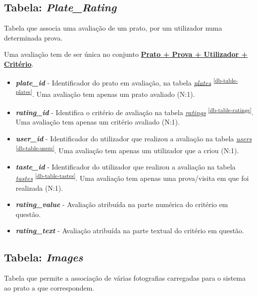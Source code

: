 \documentclass[11pt, a4paper, sans]{article}
\begin{document}
	\subsection{Tabela: \textit{Plate\_Rating}} \label{db-table-plate-rating}
	
	Tabela que associa uma avaliação de um prato, por um utilizador numa determinada prova. 
	
	Uma avaliação tem de ser única no conjunto \underline{\textbf{Prato + Prova + Utilizador + Critério}}.
	
	\begin{itemize}
		\item \textbf{\textit{plate\_id}} - Identificador do prato em avaliação, na tabela 
			\underline{\textit{plates}} \textsuperscript{\ref{db-table-plates}}. 
			Uma avaliação tem apenas um prato avaliado (N:1).
		\item \textbf{\textit{rating\_id}} - Identifica o critério de avaliação na tabela 
			\underline{\textit{ratings}} \textsuperscript{\ref{db-table-ratings}}.
			Uma avaliação tem apenas um critério avaliado (N:1).
		\item \textbf{\textit{user\_id}} - Identificador do utilizador que realizou a avaliação na tabela 
			\underline{\textit{users}} \textsuperscript{\ref{db-table-users}}.
			Uma avaliação tem apenas um utilizador que a criou (N:1).
		\item \textbf{\textit{taste\_id}} - Identificador do utilizador que realizou a avaliação na tabela 
			\underline{\textit{tastes}} \textsuperscript{\ref{db-table-tastes}}.
			Uma avaliação tem apenas uma prova/visita em que foi realizada (N:1).
		\item \textbf{\textit{rating\_value}} - Avaliação atribuída na parte numérica do critério em questão.
		\item \textbf{\textit{rating\_text}} - Avaliação atribuída na parte textual do critério em questão.
	\end{itemize}

	\subsection{Tabela: \textit{Images}} \label{db-table-plate-images}

	Tabela que permite a associação de várias fotografias carregadas para o sistema ao prato a que correspondem. 
	
\end{document}
